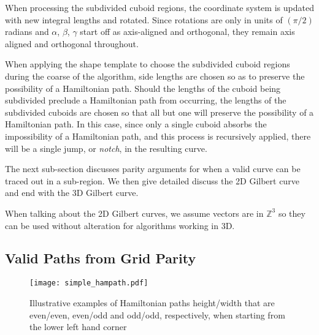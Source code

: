 When processing the subdivided cuboid regions, the coordinate system is updated
with new integral lengths and rotated.
Since rotations are only in units of $(\pi/2)$ radians and $\alpha$, $\beta$, $\gamma$ start
off as axis-aligned and orthogonal, they remain axis aligned and orthogonal throughout.

When applying the shape template to choose the subdivided cuboid regions during the coarse of the
algorithm, side lengths are chosen so as to preserve the possibility of a Hamiltonian path.
Should the lengths of the cuboid being subdivided preclude a Hamiltonian path from occurring, the lengths
of the subdivided cuboids are chosen
so that all but one will preserve the possibility of a Hamiltonian path.
In this case, since only a single cuboid absorbs the impossibility of a Hamiltonian path,
and this process is recursively applied, there will be a single jump, or \textit{notch},
in the resulting curve.


The next sub-section discusses parity arguments for when a valid curve can be
traced out in a sub-region.
We then give detailed discuss the 2D Gilbert curve and end with the 3D Gilbert curve.

When talking about the 2D Gilbert curves, we assume vectors are in $\mathbb{Z}^3$
so they can be used without alteration for algorithms working in 3D.


\subsection{Valid Paths from Grid Parity}

\begin{figure}[h]
  \centering
  \texttt{[image: simple\_hampath.pdf]}
  \caption{ Illustrative examples of Hamiltonian paths height/width that are even/even, even/odd and odd/odd, respectively,
            when starting from the lower left hand corner }
  \label{fig:exampleHampath}
\end{figure}


